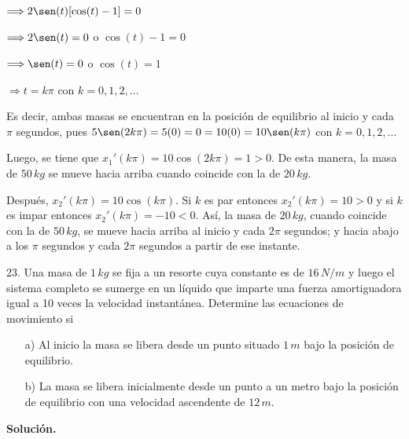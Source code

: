 \documentclass[fleqn]{article}
\begin{document}
\begin{enumerate}
        $ \Longrightarrow 2 \sen (t) [\cos (t) - 1] = 0 $

        $ \Longrightarrow 2 \sen (t) = 0 $ o $ \cos (t) - 1 = 0 $

        $ \Longrightarrow \sen (t) = 0 $ o $ \cos (t) = 1 $

        $ \Longrightarrow t = k \pi $ con $ k = 0, 1, 2, \ldots $

        Es decir, ambas masas se encuentran en la posición de equilibrio al inicio y cada $ \pi $ segundos, pues $ 5 \sen (2k \pi) = 5(0) = 0 = 10(0) = 10 \sen (k \pi) $ con $ k = 0, 1, 2, \ldots $

        Luego, se tiene que $ x_1'(k \pi) = 10 \cos (2k \pi) = 1 > 0 $. De esta manera, la masa de $ 50 \, kg $ se mueve hacia arriba cuando coincide con la de $ 20 \, kg $.

        Después, $ x_2'(k \pi) = 10 \cos (k \pi) $. Si $ k $ es par entonces $ x_2'(k \pi) = 10 > 0 $ y si $ k $ es impar entonces $ x_2'(k \pi) = -10 < 0 $. Así, la masa de $ 20 \, kg $, cuando coincide con la de $ 50 \, kg $, se mueve hacia arriba al inicio y cada $ 2 \pi $ segundos; y hacia abajo a los $ \pi $ segundos y cada $ 2 \pi $ segundos a partir de ese instante.
    \end{enumerate}

    23. Una masa de $ 1 \, kg $ se fija a un resorte cuya constante es de $ 16 \, N/m $ y luego el sistema completo se sumerge en un líquido que imparte una fuerza amortiguadora igual a 10 veces la velocidad instantánea. Determine las ecuaciones de movimiento si

    \begin{enumerate}
        \item[a)] Al inicio la masa se libera desde un punto situado $ 1 \, m $ bajo la posición de equilibrio.
        \item[b)] La masa se libera inicialmente desde un punto a un metro bajo la posición de equilibrio con una velocidad ascendente de $ 12 \, m $. 
    \end{enumerate}

    \textbf{Solución.}
\end{document}
